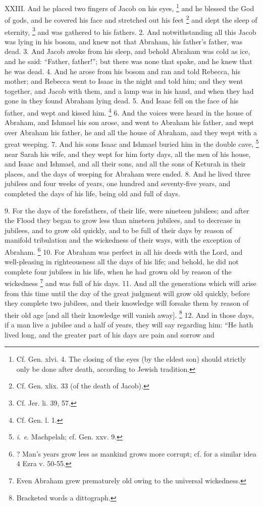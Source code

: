
XXIII. And he placed two fingers of Jacob on his eyes, \footnote{Cf. Gen. xlvi. 4. The closing of the eyes (by the eldest son) should strictly only be done after death, according to Jewish tradition.} and he blessed the God of gods, and he covered his face and stretched out his feet \footnote{Cf. Gen. xlix. 33 (of the death of Jacob).} and slept the sleep of eternity, \footnote{Cf. Jer. li. 39, 57.} and was gathered to his fathers. 2. And notwithstanding all this Jacob was lying in his bosom, and knew not that Abraham, his father's father, was dead. 3. And Jacob awoke from his sleep, and behold Abraham was cold as ice, and he said: ``Father, father!''; but there was none that spake, and he knew that he was dead. 4. And he arose from his bosom and ran and told Rebecca, his mother; and Rebecca went to Isaac in the night and told him; and they went together, and Jacob with them, and a lamp was in his hand, and when they had gone in they found Abraham lying dead. 5. And Isaac fell on the face of his father, and wept and kissed him. \footnote{Cf. Gen. l. 1.} 6. And the voices were heard in the house of Abraham, and Ishmael his son arose, and went to Abraham his father, and wept over Abraham his father, he and all the house of Abraham, and they wept with a great weeping. 7. And his sons Isaac and Ishmael buried him in the double cave, \footnote{\emph{i. e.} Machpelah; cf. Gen. xxv. 9.} near Sarah his wife, and they wept for him forty days, all the men of his house, and Isaac and Ishmael, and all their sons, and all the sons of Keturah in their places, and the days of weeping for Abraham were ended. 8. And he lived three jubilees and four weeks of years, one hundred and seventy-five years, and completed the days of his life, being old and full of days.


9. For the days of the forefathers, of their life, were nineteen jubilees; and after the Flood they began to grow less than nineteen jubilees, and to decrease in jubilees, and to grow old quickly, and to be full of their days by reason of manifold tribulation and the wickedness of their ways, with the exception of Abraham. \footnote{? Man's years grow less as mankind grows more corrupt; cf. for a similar idea 4 Ezra v. 50-55.} 10. For Abraham was perfect in all his deeds with the Lord, and well-pleasing in righteousness all the days of his life; and behold, he did not complete four jubilees in his life, when he had grown old by reason of the wickedness \footnote{Even Abraham grew prematurely old owing to the universal wickedness.} and was full of his days. 11. And all the generations which will arise from this time until the day of the great judgment will grow old quickly, before they complete two jubilees, and their knowledge will forsake them by reason of their old age [and all their knowledge will vanish away]. \footnote{Bracketed words a dittograph.} 12. And in those days, if a man live a jubilee and a half of years, they will say regarding him: ``He hath lived long, and the greater part of his days are pain and sorrow and

